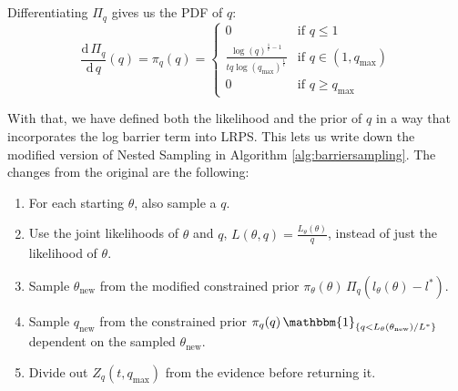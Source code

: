 \documentclass[12pt, a4paper]{report}
\begin{document}
Differentiating $\hat{\Pi}_q$ gives us the PDF of $q$:
$$
    \frac{\textrm{d} \, \Pi_q}{\textrm{d} \, q} (q) = \pi_q(q) = 
    \begin{cases}
        0 & \text{if } q \leq 1 \\
        \frac{\log(q)^{\frac{1}{t}-1}}{tq\log(q_{\textrm{max}})^\frac{1}{t}} & \text{if } q \in (1, q_{\textrm{max}})\\
        0 & \text{if } q \geq q_{\textrm{max}}
    \end{cases}
$$

With that, we have defined both the likelihood and the prior of $q$ in a way that incorporates the log barrier term into LRPS.
This lets us write down the modified version of Nested Sampling in Algorithm \ref{alg:barriersampling}.
The changes from the original are the following:
\begin{enumerate}
    \item For each starting $\theta$, also sample a $q$.
    \item Use the joint likelihoods of $\theta$ and $q$, $L(\theta, q) = \frac{L_\theta(\theta)}{q}$, instead of just the likelihood of $\theta$.
    \item Sample $\theta_{\textrm{new}}$ from the modified constrained prior $\pi_\theta(\theta) \, \Pi_q(l_\theta(\theta) - l^*)$.
    \item Sample $q_{\textrm{new}}$ from the constrained prior $\pi_q(q) \, \mathbbm{1}_{\{q < L_\theta(\theta_{\textrm{new}}) / L^*\}}$ dependent on the sampled $\theta_{\textrm{new}}$.
    \item Divide out $Z_q(t, q_{\textrm{max}})$ from the evidence before returning it.
\end{enumerate}
\vspace{0.25cm}
\end{document}

